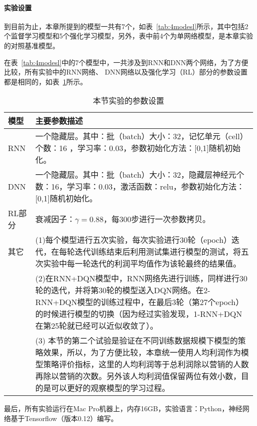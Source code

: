 \paragraph{实验设置}
到目前为止，本章所提到的模型一共有7个，如表~\ref{tab:4modesl}所示，其中包括2个监督学习模型和5个强化学习模型，另外，表中前4个为单网络模型，是本章实验的对照基准模型。

在表~\ref{tab:4modesl}中的7个模型中，一共涉及到RNN和DNN两个网络，为了方便比较，所有实验中的RNN网络、  DNN网络以及强化学习（RL）部分的参数设置都是相同的，如表~\ref{tab:4wangluocanshu}所示。

 \begin{table}[htbp]
  \centering
  \footnotesize
  \caption{本节实验的参数设置}
  \label{tab:4wangluocanshu}
  \begin{tabular}{lp{12.1cm}}  
    \toprule
      模型 & 主要参数描述 \\
    \hline
      RNN &一个隐藏层。其中：批（batch）大小：32，记忆单元（cell）个数：16 ，学习率：0.03，参数初始化方法：[0,1]随机初始化。\\
      DNN &一个隐藏层。其中：批（batch）大小：32，隐藏层神经元个数：16，学习率：0.03，激活函数：relu，参数初始化方法：[0,1]随机初始化。\\
      RL部分 & 衰减因子：$\gamma=0.88$，每300步进行一次参数拷贝。 \\ 
      \hline
      其它 & (1)每个模型进行五次实验，每次实验进行30轮（epoch）迭代，在每轮迭代训练结束后利用测试集进行模型的测试，将五次实验中每一轮迭代的利润平均值作为该轮最终的结果值。\\
      &(2)在RNN+DQN模型中，RNN网络先进行训练，同样进行30轮的迭代，并将第30轮的模型送入DQN网络。在2-RNN+DQN模型的训练过程中，在最后3轮（第27个epoch）的时候进行模型的切换（因为经过实验发现，1-RNN+DQN在第25轮就已经可以近似收敛了）。\\
      &(3) 本节的第二个试验是验证在不同训练数据规模下模型的策略效果，所以，为了方便比较，本章统一使用人均利润作为模型策略评价指标，这里的人均利润等于总利润除以营销的人数再除以营销的次数。另外该人均利润值保留两位有效小数，目的是可以更好的观察模型的学习过程。\\     
    \bottomrule
  \end{tabular}
\end{table}

最后，所有实验运行在Mac Pro机器上，内存16GB，实验语言：Python，神经网络基于Tensorflow（版本0.12）编写。

